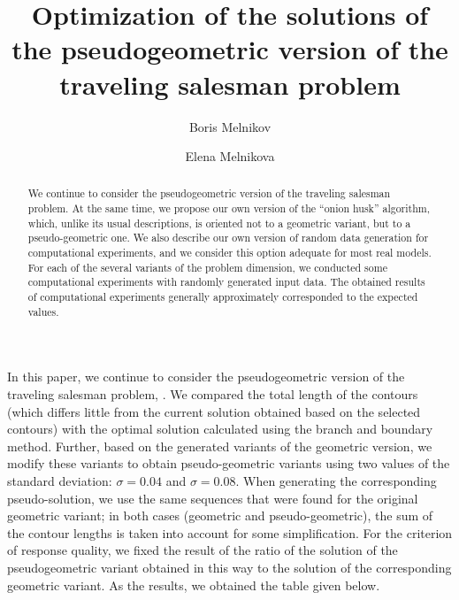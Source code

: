 \documentclass[12pt]{llncs}
\begin{document}
\fi

\title{Optimization of the solutions of the pseudogeometric version of the traveling salesman problem}
%
%
\author{%
Boris Melnikov
\and
Elena Melnikova
}
%
%
%

\maketitle              %

\begin{abstract}
We continue to consider the pseudogeometric version of the traveling salesman problem. 
At the same time, we propose our own version of the ``onion husk'' algorithm, which, unlike its usual descriptions, is oriented not to a geometric variant, but to a pseudo-geometric one.
We also describe our own version of random data generation for computational experiments, and we consider this option adequate for most real models.
For each of the several variants of the problem dimension, we conducted some computational experiments with randomly generated input data. 
The obtained results of computational experiments generally approximately corresponded to the expected values.
\end{abstract}

In this paper, 
we continue to consider the pseudogeometric version 
of the traveling salesman problem, 
\cite{gu-pu,KIO-2021,KIO-2022,Vasil-2022-1,Vasil-2022-2,SOI-2013}.
We compared the total length of the contours (which differs little from the current solution obtained based on the selected contours) with the optimal solution calculated using the branch and boundary method.
Further, based on the generated variants of the geometric version, we modify these variants to obtain pseudo-geometric variants using two values
of the standard deviation: $\sigma=0.04$ and $\sigma=0.08$.
When generating the corresponding pseudo-solution, we use the same sequences that were found for the original geometric variant;
in both cases (geometric and pseudo-geometric), the sum of the contour lengths is taken into account for some simplification.
For the criterion of response quality, we fixed the result of the ratio of the solution of the pseudogeometric variant obtained in this way to the solution of the corresponding geometric variant.
As the results,
we obtained the table given below.
\end{document}
